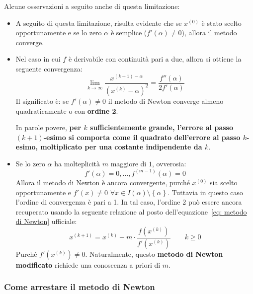 \highspace
Alcune osservazioni a seguito anche di questa limitazione:
\begin{itemize}
    \item A seguito di questa limitazione, risulta evidente che se $x^{(0)}$ è stato scelto opportunamente e se lo zero $\alpha$ è semplice ($f'\left(\alpha\right) \ne 0$), allora il metodo converge.
    
    \item Nel caso in cui $f$ è derivabile con continuità pari a due, allora si ottiene la seguente convergenza:
    \begin{equation}
        \displaystyle \lim_{k \rightarrow \infty} \dfrac{x^{\left(k+1\right) - \alpha}}{\left(x^{(k)} - \alpha\right)^{2}} = \dfrac{f''\left(\alpha\right)}{2f'\left(\alpha\right)}
    \end{equation}
    Il significato è: se $f'\left(\alpha\right) \ne 0$ il metodo di Newton converge almeno quadraticamente o con \textbf{ordine 2}.

    In parole povere, \textbf{per $k$ sufficientemente grande, l'errore al passo $\left(k+1\right)$-esimo si comporta come il quadrato dell'errore al passo $k$-esimo, moltiplicato per una costante indipendente da $k$}.

    \item Se lo zero $\alpha$ ha molteplicità $m$ maggiore di $1$, ovverosia:
    \begin{equation*}
        f'\left(\alpha\right) = 0, \dots, f^{\left(m-1\right)}\left(\alpha\right) = 0
    \end{equation*}
    Allora il metodo di Newton è ancora convergente, purché $x^{(0)}$ sia scelto opportunamente e $f'\left(x\right) \ne 0$ $\forall x \in I\left(\alpha\right) \setminus \left\{\alpha\right\}$. Tuttavia in questo caso l'ordine di convergenza è pari a 1. In tal caso, l'ordine 2 può essere ancora recuperato usando la seguente relazione al posto dell'equazione~\ref{eq: metodo di Newton} ufficiale:
    \begin{equation}
        x^{\left(k+1\right)} = x^{(k)} - m \cdot \dfrac{f\left(x^{(k)}\right)}{f'\left(x^{(k)}\right)} \hspace{2em} k \ge 0
    \end{equation}
    Purché $f'\left(x^{(k)}\right) \ne 0$. Naturalmente, questo \textbf{metodo di Newton modificato} richiede una conoscenza a priori di $m$.
\end{itemize}

\longline

\subsubsection{Come arrestare il metodo di Newton}

